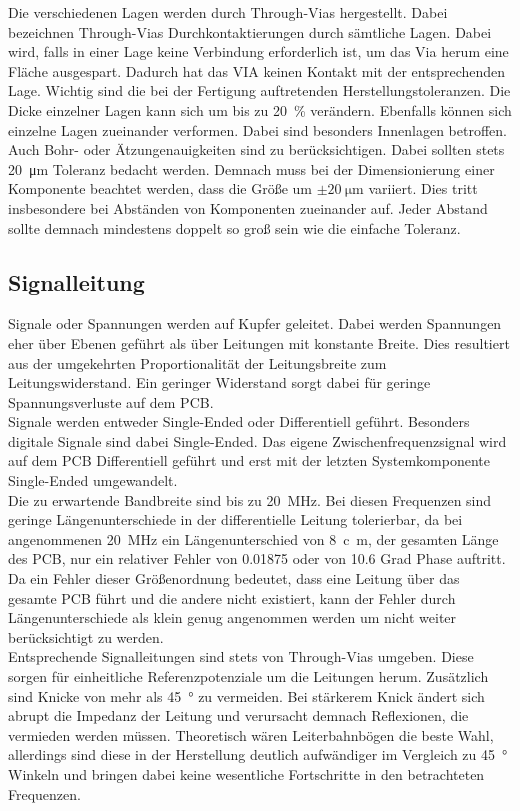 Die verschiedenen Lagen werden durch Through-Vias hergestellt. Dabei bezeichnen Through-Vias Durchkontaktierungen durch sämtliche Lagen. Dabei wird, falls in einer Lage keine Verbindung erforderlich ist, um das Via herum eine Fläche ausgespart. Dadurch hat das VIA keinen Kontakt mit der entsprechenden Lage. Wichtig sind die bei der Fertigung auftretenden Herstellungstoleranzen. Die Dicke einzelner Lagen kann sich um bis zu \SI{20}{\percent} verändern. Ebenfalls können sich einzelne Lagen zueinander verformen. Dabei sind besonders Innenlagen betroffen. Auch Bohr- oder Ätzungenauigkeiten sind zu berücksichtigen. Dabei sollten stets \SI{20}{\micro\meter} Toleranz bedacht werden. Demnach muss bei der Dimensionierung einer Komponente beachtet werden, dass die Größe um $\pm \SI{20}{\micro\meter}$ variiert. Dies tritt insbesondere bei Abständen von Komponenten zueinander auf. Jeder Abstand sollte demnach mindestens doppelt so groß sein wie die einfache Toleranz.
\subsection{Signalleitung}
Signale oder Spannungen werden auf Kupfer geleitet. Dabei werden Spannungen eher über Ebenen geführt als über Leitungen mit konstante Breite. Dies resultiert aus der umgekehrten Proportionalität der Leitungsbreite zum Leitungswiderstand. Ein geringer Widerstand sorgt dabei für geringe Spannungsverluste auf dem PCB.\\
Signale werden entweder Single-Ended oder Differentiell geführt. Besonders digitale Signale sind dabei Single-Ended. Das eigene Zwischenfrequenzsignal wird auf dem PCB Differentiell geführt und erst mit der letzten Systemkomponente Single-Ended umgewandelt.\\
Die zu erwartende Bandbreite sind bis zu \SI{20}{\mega\hertz}. Bei diesen Frequenzen sind geringe Längenunterschiede in der differentielle Leitung tolerierbar, da bei angenommenen \SI{20}{\mega\hertz} ein Längenunterschied von \SI{8}{c\meter}, der gesamten Länge des PCB, nur ein relativer Fehler von 0.01875 oder von 10.6 Grad Phase auftritt. Da ein Fehler dieser Größenordnung bedeutet, dass eine Leitung über das gesamte PCB führt und die andere nicht existiert, kann der Fehler durch Längenunterschiede als klein genug angenommen werden um nicht weiter berücksichtigt zu werden.\\
Entsprechende Signalleitungen sind stets von Through-Vias umgeben. Diese sorgen für einheitliche Referenzpotenziale um die Leitungen herum. Zusätzlich sind Knicke von mehr als \SI{45}{\degree} zu vermeiden. Bei stärkerem Knick ändert sich abrupt die Impedanz der Leitung und verursacht demnach Reflexionen, die vermieden werden müssen. Theoretisch wären Leiterbahnbögen die beste Wahl, allerdings sind diese in der Herstellung deutlich aufwändiger im Vergleich zu \SI{45}{\degree} Winkeln und bringen dabei keine wesentliche Fortschritte in den betrachteten Frequenzen.\\
